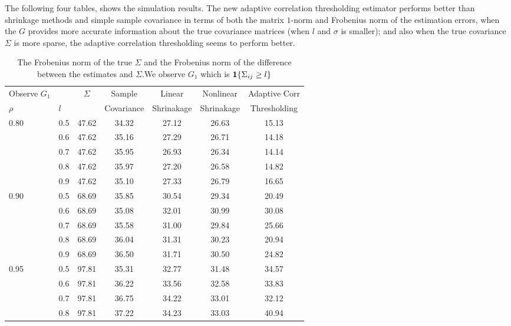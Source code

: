         The following four tables,  shows the simulation results. The new adaptive correlation thresholding estimator performs better than  shrinkage methods and simple sample covariance in terms of both the matrix \(1\)-norm and Frobenius norm of the estimation errors, when the \(G\) provides more accurate information about the true covariance matrices (when \(l\) and \(\sigma\) is smaller); and also when the true covariance \(\Sigma\) is more sparse, the adaptive correlation thresholding seems to perform better. 
        \begin{table}[htbp]
            \centering
            \caption{The Frobenius norm of the true \(\Sigma\) and the Frobenius norm of the difference between the estimates and \(\Sigma\).We observe \(G_{1}\) which is \(\mathbf{1}\Bqty{\Sigma_{ij} \geq l}\) }          
            \begin{tabular}{ll|ccccc}
                \toprule
                Observe \(G_{1}\) && \(\Sigma\) &Sample  &Linear  &Nonlinear &Adaptive Corr \\
                \(\rho\) &\(l\) &&Covariance&Shrinakage&Shrinakage&Thresholding\\
                \midrule
                0.80 &0.5 &47.62 &34.32 &27.12 &26.63 &15.13 \\
                     &0.6 &47.62 &35.16 &27.29 &26.71 &14.18 \\
                     &0.7 &47.62 &35.95 &26.93 &26.34 &14.14 \\
                     &0.8 &47.62 &35.97 &27.20 &26.58 &14.82 \\
                     &0.9 &47.62 &35.10 &27.33 &26.79 &16.65 \\
                0.90 &0.5 &68.69 &35.85 &30.54 &29.34 &20.49 \\
                     &0.6 &68.69 &35.08 &32.01 &30.99 &30.08 \\
                     &0.7 &68.69 &35.58 &31.00 &29.84 &25.66 \\
                     &0.8 &68.69 &36.04 &31.31 &30.23 &20.94 \\
                     &0.9 &68.69 &36.50 &31.71 &30.50 &24.82 \\
                0.95 &0.5 &97.81 &35.31 &32.77 &31.48 &34.57 \\
                     &0.6 &97.81 &36.22 &33.56 &32.58 &33.83 \\
                     &0.7 &97.81 &36.75 &34.22 &33.01 &32.12 \\
                     &0.8 &97.81 &37.22 &34.23 &33.03 &40.94 \\

\end{tabular}
\end{table}
